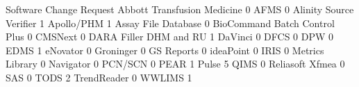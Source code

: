 \documentclass{article}
\begin{document}
\begin{Schunk}
\begin{Soutput}
                                Software Change Request
  Abbott Transfusion Medicine                         0
  AFMS                                                0
  Alinity Source Verifier                             1
  Apollo/PHM                                          1
  Assay File Database                                 0
  BioCommand Batch Control Plus                       0
  CMSNext                                             0
  DARA Filler DHM and RU                              1
  DaVinci                                             0
  DFCS                                                0
  DPW                                                 0
  EDMS                                                1
  eNovator                                            0
  Groninger                                           0
  GS Reports                                          0
  ideaPoint                                           0
  IRIS                                                0
  Metrics Library                                     0
  Navigator                                           0
  PCN/SCN                                             0
  PEAR                                                1
  Pulse                                               5
  QIMS                                                0
  Reliasoft Xfmea                                     0
  SAS                                                 0
  TODS                                                2
  TrendReader                                         0
  WWLIMS                                              1
                               

\end{Soutput}
\end{Schunk}
\end{document}
